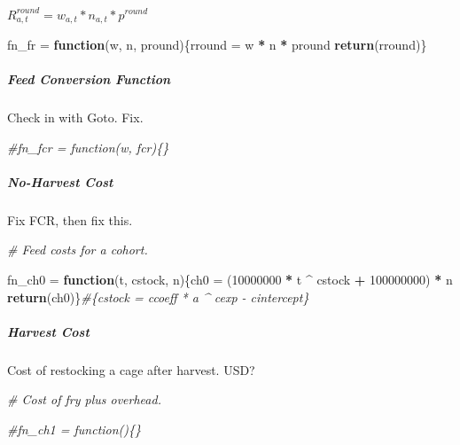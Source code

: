 \documentclass[]{article}
\newenvironment{Shaded}{\begin{snugshade}}{\end{snugshade}}
\newcommand{\KeywordTok}[1]{\textcolor[rgb]{0.13,0.29,0.53}{\textbf{#1}}}
\newcommand{\DecValTok}[1]{\textcolor[rgb]{0.00,0.00,0.81}{#1}}
\newcommand{\StringTok}[1]{\textcolor[rgb]{0.31,0.60,0.02}{#1}}
\newcommand{\CommentTok}[1]{\textcolor[rgb]{0.56,0.35,0.01}{\textit{#1}}}
\newcommand{\ControlFlowTok}[1]{\textcolor[rgb]{0.13,0.29,0.53}{\textbf{#1}}}
\newcommand{\OperatorTok}[1]{\textcolor[rgb]{0.81,0.36,0.00}{\textbf{#1}}}
\newcommand{\NormalTok}[1]{#1}
\let\oldsubparagraph\subparagraph
\renewcommand{\subparagraph}[1]{\oldsubparagraph{#1}\mbox{}}
\begin{document}
\(R^{round}_{a, t} = w_{a, t} * n_{a, t} * p^{round}\)

\begin{Shaded}
\begin{Highlighting}[]
\NormalTok{fn_fr =}\StringTok{ }\ControlFlowTok{function}\NormalTok{(w, n, pround)\{rround =}\StringTok{ }\NormalTok{w }\OperatorTok{*}\StringTok{ }\NormalTok{n }\OperatorTok{*}\StringTok{ }\NormalTok{pround}
                               \KeywordTok{return}\NormalTok{(rround)\}}
\end{Highlighting}
\end{Shaded}

\subparagraph{Feed Conversion Function}\label{feed-conversion-function}

Check in with Goto. Fix.

\begin{Shaded}
\begin{Highlighting}[]
\CommentTok{#fn_fcr = function(w, fcr)\{\}}
\end{Highlighting}
\end{Shaded}

\subparagraph{No-Harvest Cost}\label{no-harvest-cost}

Fix FCR, then fix this.

\begin{Shaded}
\begin{Highlighting}[]
\CommentTok{# Feed costs for a cohort.}

\NormalTok{fn_ch0 =}\StringTok{ }\ControlFlowTok{function}\NormalTok{(t, cstock, n)\{ch0 =}\StringTok{ }\NormalTok{(}\DecValTok{10000000} \OperatorTok{*}\StringTok{ }\NormalTok{t }\OperatorTok{^}\StringTok{ }\NormalTok{cstock }\OperatorTok{+}\StringTok{ }\DecValTok{100000000}\NormalTok{) }\OperatorTok{*}\StringTok{ }\NormalTok{n}
                                \KeywordTok{return}\NormalTok{(ch0)\}}\CommentTok{#\{cstock = ccoeff * a ^ cexp - cintercept\}}
\end{Highlighting}
\end{Shaded}

\subparagraph{Harvest Cost}\label{harvest-cost}

Cost of restocking a cage after harvest. USD?

\begin{Shaded}
\begin{Highlighting}[]
\CommentTok{# Cost of fry plus overhead.}

\CommentTok{#fn_ch1 = function()\{\}}
\end{Highlighting}
\end{Shaded}
\end{document}
